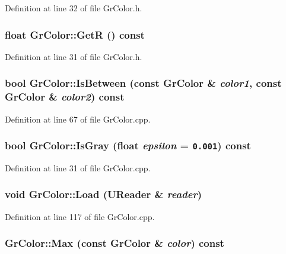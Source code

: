 Definition at line 32 of file GrColor.h.\hypertarget{class_gr_color_2dfa131b3694f4643ebace7490e3a3a6}{
\subsubsection[{GetR}]{\setlength{\rightskip}{0pt plus 5cm}float GrColor::GetR () const}}
\label{class_gr_color_2dfa131b3694f4643ebace7490e3a3a6}




Definition at line 31 of file GrColor.h.\hypertarget{class_gr_color_9f8a562ac885147466319ebae124fbe3}{
\subsubsection[{IsBetween}]{\setlength{\rightskip}{0pt plus 5cm}bool GrColor::IsBetween (const {\bf GrColor} \& {\em color1}, \/  const {\bf GrColor} \& {\em color2}) const}}
\label{class_gr_color_9f8a562ac885147466319ebae124fbe3}




Definition at line 67 of file GrColor.cpp.\hypertarget{class_gr_color_a024a38e4863cade448b994b06c2ea2d}{
\subsubsection[{IsGray}]{\setlength{\rightskip}{0pt plus 5cm}bool GrColor::IsGray (float {\em epsilon} = {\tt 0.001}) const}}
\label{class_gr_color_a024a38e4863cade448b994b06c2ea2d}




Definition at line 31 of file GrColor.cpp.\hypertarget{class_gr_color_266f03bb3ae07245da1d3c033d4c2c84}{
\subsubsection[{Load}]{\setlength{\rightskip}{0pt plus 5cm}void GrColor::Load ({\bf UReader} \& {\em reader})}}
\label{class_gr_color_266f03bb3ae07245da1d3c033d4c2c84}




Definition at line 117 of file GrColor.cpp.\hypertarget{class_gr_color_b9460ce4ebfe9d2c5a83c48221a7bf4c}{
\subsubsection[{Max}]{ GrColor::Max (const {\bf GrColor} \& {\em color}) const}}
\label{class_gr_color_b9460ce4ebfe9d2c5a83c48221a7bf4c}




